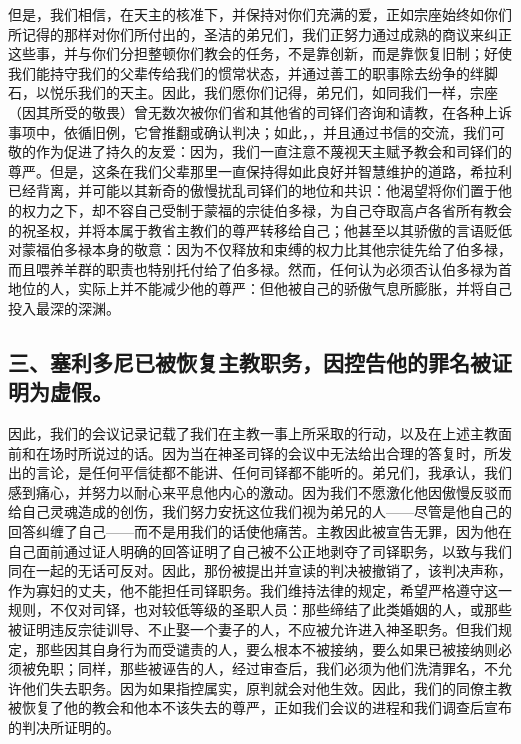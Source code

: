但是，我们相信，在天主的核准下，并保持对你们充满的爱，正如宗座始终如你们所记得的那样对你们所付出的，圣洁的弟兄们，我们正努力通过成熟的商议来纠正这些事，并与你们分担整顿你们教会的任务，不是靠创新，而是靠恢复旧制；好使我们能持守我们的父辈传给我们的惯常状态，并通过善工的职事除去纷争的绊脚石，以悦乐我们的天主。因此，我们愿你们记得，弟兄们，如同我们一样，宗座（因其所受的敬畏）曾无数次被你们省和其他省的司铎们咨询和请教，在各种上诉事项中，依循旧例，它曾推翻或确认判决；如此，，并且通过书信的交流，我们可敬的作为促进了持久的友爱：因为，我们一直注意不蔑视天主赋予教会和司铎们的尊严。但是，这条在我们父辈那里一直保持得如此良好并智慧维护的道路，希拉利已经背离，并可能以其新奇的傲慢扰乱司铎们的地位和共识：他渴望将你们置于他的权力之下，却不容自己受制于蒙福的宗徒伯多禄，为自己夺取高卢各省所有教会的祝圣权，并将本属于教省主教们的尊严转移给自己；他甚至以其骄傲的言语贬低对蒙福伯多禄本身的敬意：因为不仅释放和束缚的权力比其他宗徒先给了伯多禄，而且喂养羊群的职责也特别托付给了伯多禄。然而，任何认为必须否认伯多禄为首地位的人，实际上并不能减少他的尊严：但他被自己的骄傲气息所膨胀，并将自己投入最深的深渊。\par


\subsection{三、塞利多尼已被恢复主教职务，因控告他的罪名被证明为虚假。}

因此，我们的会议记录记载了我们在主教一事上所采取的行动，以及在上述主教面前和在场时所说过的话。因为当在神圣司铎的会议中无法给出合理的答复时，所发出的言论，是任何平信徒都不能讲、任何司铎都不能听的。弟兄们，我承认，我们感到痛心，并努力以耐心来平息他内心的激动。因为我们不愿激化他因傲慢反驳而给自己灵魂造成的创伤，我们努力安抚这位我们视为弟兄的人——尽管是他自己的回答纠缠了自己——而不是用我们的话使他痛苦。主教因此被宣告无罪，因为他在自己面前通过证人明确的回答证明了自己被不公正地剥夺了司铎职务，以致与我们同在一起的无话可反对。因此，那份被提出并宣读的判决被撤销了，该判决声称，作为寡妇的丈夫，他不能担任司铎职务。我们维持法律的规定，希望严格遵守这一规则，不仅对司铎，也对较低等级的圣职人员：那些缔结了此类婚姻的人，或那些被证明违反宗徒训导、不止娶一个妻子的人，不应被允许进入神圣职务。但我们规定，那些因其自身行为而受谴责的人，要么根本不被接纳，要么如果已被接纳则必须被免职；同样，那些被诬告的人，经过审查后，我们必须为他们洗清罪名，不允许他们失去职务。因为如果指控属实，原判就会对他生效。因此，我们的同僚主教被恢复了他的教会和他本不该失去的尊严，正如我们会议的进程和我们调查后宣布的判决所证明的。\par

